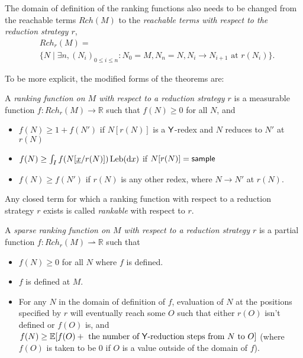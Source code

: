 The domain of definition of the ranking functions also needs to be changed from the reachable terms $Rch(M)$ to the \emph{reachable terms with respect to the reduction strategy $r$},
\begin{align*}
& Rch_r(M) = \\ & \{N \mid \exists n, (N_i)_{0 \leq i \leq n}: N_0 = M, N_n = N, N_i \to N_{i+1} \text{ at } r(N_i)\}.
\end{align*}

To be more explicit, the modified forms of the theorems are:
\begin{definition}\rm
A \emph{ranking function on $M$ with respect to a reduction strategy $r$} is a measurable function $f:\mathit{Rch}_r(M) \to \mathbb{R}$ such that $f(N) \geq 0$ for all $N$, and
\begin{itemize}
    \item $f(N) \geq 1+ f(N')$ if $N[r(N)]$ is a $\mathsf{Y}$-redex and $N$ reduces to $N'$ at $r(N)$
    \item $f(N) \geq \int_I f(N[\underline{x}/r(N)]) \, \mathrm{Leb}(\mathrm{d}x)$ if $N[r(N)] = \mathsf{sample}$

    \item $f(N) \geq f(N')$ if $r(N)$ is any other redex, where $N \to N'$ at $r(N)$.
\end{itemize}
Any closed term for which a ranking function with respect to a reduction strategy $r$ exists is called \emph{rankable} with respect to $r$. 
\end{definition}

\begin{definition}
A \emph{sparse ranking function on $M$ with respect to a reduction strategy $r$} is a partial function $f : Rch_r(M) \rightharpoonup \mathbb R$ such that
\begin{itemize}
    \item $f(N) \geq 0$ for all $N$ where $f$ is defined.
    \item $f$ is defined at $M$.
    \item For any $N$ in the domain of definition of $f$, evaluation of $N$ at the positions specified by $r$ will eventually reach some $O$ such that either $r(O)$ isn't defined or $f(O)$ is, and $f(N) \geq \mathbb E[f(O) + \text{ the number of $\mathsf{Y}$-reduction steps from $N$ to $O$}]$ (where $f(O)$ is taken to be 0 if $O$ is a value outside of the domain of $f$).
\end{itemize}
\end{definition}

